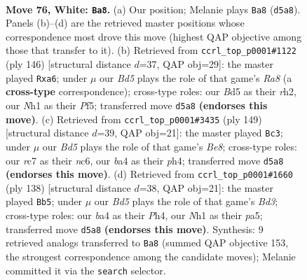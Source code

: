 \documentclass[11pt]{article}
\begin{document}
\clearpage

\begin{figure}[p]\centering
\begin{subfigure}{0.46\textwidth}\centering
\resizebox{\linewidth}{!}{%
\newchessgame
\chessboard[
  setfen={8/2r2p2/n5p1/3BP2p/b4Pp1/8/3k1K1P/7N w - - 10 76},
  showmover=false,
  pgfstyle=straightmove, color=movearrow, markmove={d5-a8}
]}
\caption{}
\end{subfigure}\hfill
\begin{subfigure}{0.46\textwidth}\centering
\resizebox{\linewidth}{!}{%
\newchessgame
\chessboard[
  setfen={R7/6pk/pB3p2/Pp3P1p/7P/8/7r/3K4 w - - 9 74},
  showmover=false,
  pgfstyle=straightmove, color=movearrow, markmove={a8-a6}
]}
\caption{}
\end{subfigure}
\\[4pt]
\begin{subfigure}{0.46\textwidth}\centering
\resizebox{\linewidth}{!}{%
\newchessgame
\chessboard[
  setfen={8/8/2N1k1p1/7p/5P1P/p4KP1/P7/4b3 b - - 18 75},
  showmover=false,
  pgfstyle=straightmove, color=movearrow, markmove={e1-c3}
]}
\caption{}
\end{subfigure}\hfill
\begin{subfigure}{0.46\textwidth}\centering
\resizebox{\linewidth}{!}{%
\newchessgame
\chessboard[
  setfen={2k2r2/8/1PP3p1/p2p1p2/3P1PpP/3B4/8/6K1 w - - 17 70},
  showmover=false,
  pgfstyle=straightmove, color=movearrow, markmove={d3-b5}
]}
\caption{}
\end{subfigure}
\caption{\textbf{Move 76, White: \texttt{Ba8}.} (a) Our position; Melanie plays \texttt{Ba8} (\texttt{d5a8}). Panels (b)--(d) are the retrieved master positions whose correspondence most drove this move (highest QAP objective among those that transfer to it). (b) Retrieved from \texttt{ccrl\_top\_p0001\#1122} (ply 146) [structural distance $d$=37, QAP obj=29]: the master played \texttt{Rxa6}; under $\mu$ our \emph{Bd5} plays the role of that game's \emph{Ra8} (a \textbf{cross-type} correspondence); cross-type roles: our \emph{B}d5 as their \emph{r}h2, our \emph{N}h1 as their \emph{P}f5; transferred move \texttt{d5a8} \textbf{(endorses this move)}. (c) Retrieved from \texttt{ccrl\_top\_p0001\#3435} (ply 149) [structural distance $d$=39, QAP obj=21]: the master played \texttt{Bc3}; under $\mu$ our \emph{Bd5} plays the role of that game's \emph{Be8}; cross-type roles: our \emph{r}c7 as their \emph{n}c6, our \emph{b}a4 as their \emph{p}h4; transferred move \texttt{d5a8} \textbf{(endorses this move)}. (d) Retrieved from \texttt{ccrl\_top\_p0001\#1660} (ply 138) [structural distance $d$=38, QAP obj=21]: the master played \texttt{Bb5}; under $\mu$ our \emph{Bd5} plays the role of that game's \emph{Bd3}; cross-type roles: our \emph{b}a4 as their \emph{P}h4, our \emph{N}h1 as their \emph{p}a5; transferred move \texttt{d5a8} \textbf{(endorses this move)}. Synthesis: 9 retrieved analogs transferred to \texttt{Ba8} (summed QAP objective 153, the strongest correspondence among the candidate moves); Melanie committed it via the \texttt{search} selector.}
\label{fig:thought-m150}
\end{figure}
\end{document}
